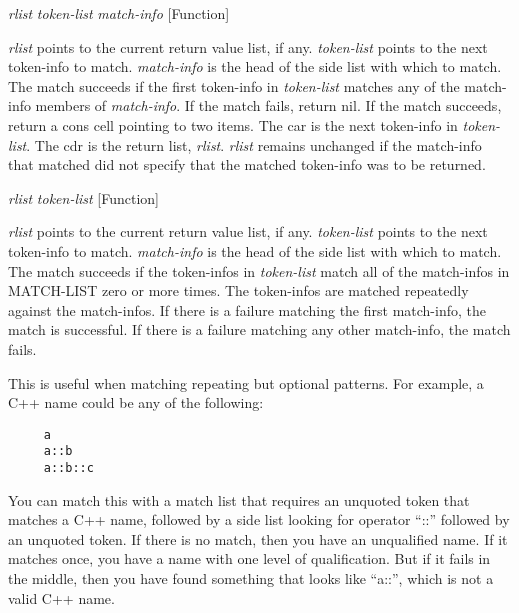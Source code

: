 \vspace{1em}
\noindent
{}
\usebox{\funcname}\emph{rlist} \emph{token-list} \emph{match-info}
 \hfill [Function]

\begin{doc-string}
\emph{rlist} points to the current return value list, if any.  \emph{token-list} points to
the next token-info to match.  \emph{match-info} is the head of the side list with
which to match.  The match succeeds if the first token-info in \emph{token-list}
matches any of the match-info members of \emph{match-info}.  If the match fails, return
nil.  If the match succeeds, return a cons cell pointing to two items.  The car
is the next token-info in \emph{token-list}.  The cdr is the return list, \emph{rlist}.  \emph{rlist}
remains unchanged if the match-info that matched did not specify that the
matched token-info was to be returned.
\end{doc-string}

\vspace{1em}
\noindent
{}
\usebox{\funcname}\emph{rlist} \emph{token-list}
 \hfill [Function]
\hspace*{\wd\funcname}

\begin{doc-string}
\emph{rlist} points to the current return value list, if any.  \emph{token-list} points to
the next token-info to match.  \emph{match-info} is the head of the side list with
which to match.  The match succeeds if the token-infos in \emph{token-list} match all
of the match-infos in MATCH-LIST zero or more times.  The token-infos are
matched repeatedly against the match-infos.  If there is a failure matching the
first match-info, the match is successful.  If there is a failure matching any
other match-info, the match fails.

This is useful when matching repeating but optional patterns.  For example, a
C++ name could be any of the following:

\small{\begin{verbatim}
     a
     a::b
     a::b::c
\end{verbatim}}

You can match this with a match list that requires an unquoted token that
matches a C++ name, followed by a side list looking for operator ``::'' followed
by an unquoted token.  If there is no match, then you have an unqualified name.
If it matches once, you have a name with one level of qualification.  But if it
fails in the middle, then you have found something that looks like ``a::'',
which is not a valid C++ name.
\end{doc-string}

